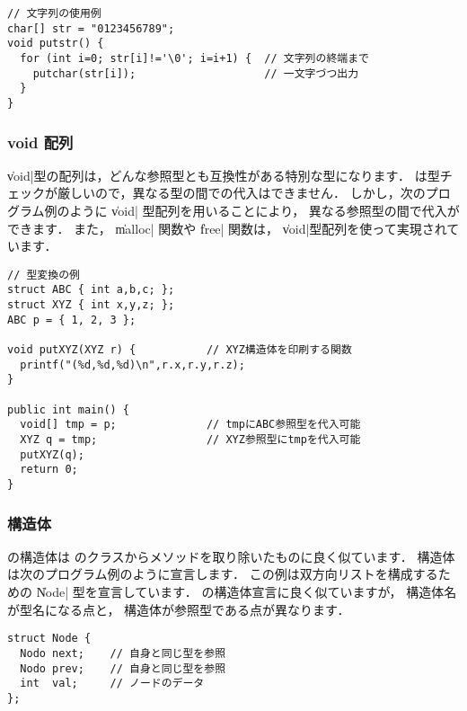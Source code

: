 \begin{mylist}
\begin{verbatim}
// 文字列の使用例
char[] str = "0123456789";
void putstr() {
  for (int i=0; str[i]!='\0'; i=i+1) {  // 文字列の終端まで
    putchar(str[i]);                    // 一文字づつ出力
  }
}
\end{verbatim}
\end{mylist}

\subsubsection{ void 配列}

\|void|型の配列は，どんな参照型とも互換性がある特別な型になります．
\cmml は型チェックが厳しいので，異なる型の間での代入はできません．
しかし，次のプログラム例のように \|void| 型配列を用いることにより，
異なる参照型の間で代入ができます．
また， \|malloc| 関数や \|free| 関数は，
\|void|型配列を使って実現されています．

\begin{mylist}
\begin{verbatim}
// 型変換の例
struct ABC { int a,b,c; };
struct XYZ { int x,y,z; };
ABC p = { 1, 2, 3 };

void putXYZ(XYZ r) {           // XYZ構造体を印刷する関数
  printf("(%d,%d,%d)\n",r.x,r.y,r.z);
}

public int main() {
  void[] tmp = p;              // tmpにABC参照型を代入可能
  XYZ q = tmp;                 // XYZ参照型にtmpを代入可能
  putXYZ(q);
  return 0;
}
\end{verbatim}
\end{mylist}

\subsubsection{構造体}

\label{chap3:struct}
\cmml の構造体は \javal のクラスからメソッドを取り除いたものに良く似ています．
構造体は次のプログラム例のように宣言します．
この例は双方向リストを構成するための \|Node| 型を宣言しています．
\cl の構造体宣言に良く似ていますが，
構造体名が型名になる点と，
構造体が参照型である点が異なります．

\begin{mylist}
\begin{verbatim}
struct Node {
  Nodo next;    // 自身と同じ型を参照
  Nodo prev;    // 自身と同じ型を参照
  int  val;     // ノードのデータ
};
\end{verbatim}
\end{mylist}

